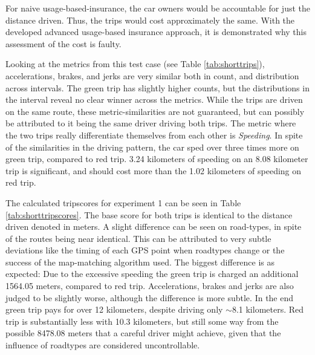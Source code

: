 For naive usage-based-insurance, the car owners would be accountable for just the distance driven. Thus, the trips would cost approximately the same. With the developed advanced usage-based insurance approach, it is demonstrated why this assessment of the cost is faulty.

Looking at the metrics from this test case (see Table  \ref{tab:shorttrips}), accelerations, brakes, and jerks are very similar both in count, and distribution across intervals. The green trip has slightly higher counts, but the distributions in the interval reveal no clear winner across the metrics. While the trips are driven on the same route, these metric-similarities are not guaranteed, but can possibly be attributed to it being the same driver driving both trips. The metric where the two trips really differentiate themselves from each other is \textit{Speeding}. In spite of the similarities in the driving pattern, the car sped over three times more on green trip, compared to red trip. 3.24 kilometers of speeding on an 8.08 kilometer trip is significant, and should cost more than the 1.02 kilometers of speeding on red trip.

The calculated tripscores for experiment 1 can be seen in Table \ref{tab:shorttripscores}. The base score for both trips is identical to the distance driven denoted in meters. A slight difference can be seen on road-types, in spite of the routes being near identical. This can be attributed to very subtle deviations like the timing of each GPS point when roadtypes change or the success of the map-matching algorithm used. The biggest difference is as expected: Due to the excessive speeding the green trip is charged an additional 1564.05 meters, compared to red trip. Accelerations, brakes and jerks are also judged to be slightly worse, although the difference is more subtle. In the end green trip pays for over 12 kilometers, despite driving only $\sim$8.1 kilometers. Red trip is substantially less with 10.3 kilometers, but still some way from the possible 8478.08 meters that a careful driver might achieve, given that the influence of roadtypes are considered uncontrollable.

